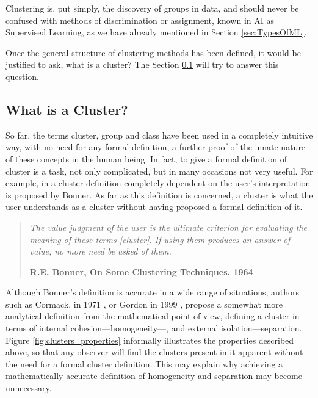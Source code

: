 Clustering is, put simply, the discovery of groups in data, and should never be confused with methods of discrimination or assignment, known in \acs{AI} as Supervised Learning, as we have already mentioned in Section \ref{sec:TypesOfML}. 

Once the general structure of clustering methods has been defined, it would be justified to ask, what is a cluster? The Section \ref{sec:WhatIsCluster} will try to answer this question.

\subsection{What is a Cluster?} \label{sec:WhatIsCluster}

So far, the terms cluster, group and class have been used in a completely intuitive way, with no need for any formal definition, a further proof of the innate nature of these concepts in the human being. In fact, to give a formal definition of cluster is a task, not only complicated, but in many occasions not very useful. For example, in \cite{lance1967general} a cluster definition completely dependent on the user's interpretation is proposed by Bonner. As far as this definition is concerned, a cluster is what the user understands as a cluster without having proposed a formal definition of it.

\begin{quotation}{\slshape
		The value judgment of the user is the ultimate criterion for evaluating the meaning of these terms [cluster]. If using them produces an answer of value, no more need be asked of them.}
	\begin{flushright}
		\textbf{R.E. Bonner, On Some Clustering Techniques, 1964} 
	\end{flushright}
\end{quotation}

Although Bonner's definition is accurate in a wide range of situations, authors such as Cormack, in 1971 \cite{cormack1971review}, or Gordon in 1999 \cite{gordon:1999}, propose a somewhat more analytical definition from the mathematical point of view, defining a cluster in terms of internal cohesion---homogeneity---, and external isolation---separation. Figure \ref{fig:clusters_properties} informally illustrates the properties described above, so that any observer will find the clusters present in it apparent without the need for a formal cluster definition. This may explain why achieving a mathematically accurate definition of homogeneity and separation may become unnecessary.

